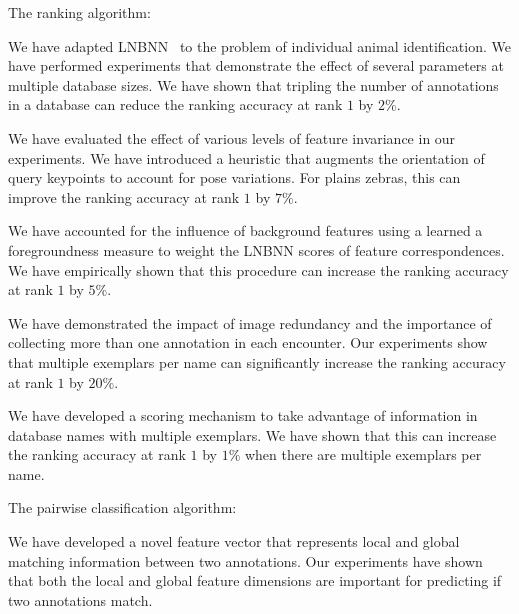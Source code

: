     \begin{enumln}
    \item {The ranking algorithm}:
        \begin{enumln}
        \item
        We have adapted LNBNN~\cite{mccann_local_2012} to the problem of individual animal identification.
        We have performed experiments that demonstrate the effect of several parameters at multiple database
          sizes.
        We have shown that tripling the number of annotations in a database can reduce the ranking accuracy at
          rank $1$ by $2\percent$.

        \item
        We have evaluated the effect of various levels of feature invariance in our experiments.
        We have introduced a heuristic that augments the orientation of query keypoints to account for pose
          variations.
        For plains zebras, this can improve the ranking accuracy at rank $1$ by $7\percent$.

        \item
        We have accounted for the influence of background features using a learned a foregroundness measure to
          weight the LNBNN scores of feature correspondences.
        We have empirically shown that this procedure can increase the ranking accuracy at rank $1$ by
          $5\percent$.


        \item We have demonstrated the impact of image redundancy and the importance of collecting more than one
          annotation in each encounter.
        Our experiments show that multiple exemplars per name can significantly increase the ranking accuracy at
          rank $1$ by $20\percent$.

        \item We have developed a \name{} scoring mechanism to take advantage of information in database names
          with multiple exemplars.
        We have shown that this can increase the ranking accuracy at rank $1$ by $1\percent$ when there are
          multiple exemplars per name.
        \end{enumln}

    \item {The pairwise classification algorithm}:
        \begin{enumln}

        \item We have developed a novel feature vector that represents local and global matching information
          between two annotations.
        Our experiments have shown that both the local and global feature dimensions are important for predicting
          if two annotations match.


\end{enumln}
\end{enumln}
